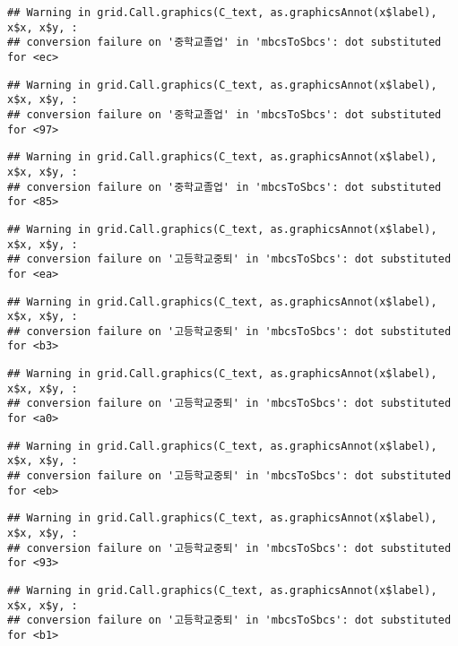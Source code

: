 \documentclass[
]{article}
\begin{document}
\begin{verbatim}
## Warning in grid.Call.graphics(C_text, as.graphicsAnnot(x$label), x$x, x$y, :
## conversion failure on '중학교졸업' in 'mbcsToSbcs': dot substituted for <ec>
\end{verbatim}

\begin{verbatim}
## Warning in grid.Call.graphics(C_text, as.graphicsAnnot(x$label), x$x, x$y, :
## conversion failure on '중학교졸업' in 'mbcsToSbcs': dot substituted for <97>
\end{verbatim}

\begin{verbatim}
## Warning in grid.Call.graphics(C_text, as.graphicsAnnot(x$label), x$x, x$y, :
## conversion failure on '중학교졸업' in 'mbcsToSbcs': dot substituted for <85>
\end{verbatim}

\begin{verbatim}
## Warning in grid.Call.graphics(C_text, as.graphicsAnnot(x$label), x$x, x$y, :
## conversion failure on '고등학교중퇴' in 'mbcsToSbcs': dot substituted for <ea>
\end{verbatim}

\begin{verbatim}
## Warning in grid.Call.graphics(C_text, as.graphicsAnnot(x$label), x$x, x$y, :
## conversion failure on '고등학교중퇴' in 'mbcsToSbcs': dot substituted for <b3>
\end{verbatim}

\begin{verbatim}
## Warning in grid.Call.graphics(C_text, as.graphicsAnnot(x$label), x$x, x$y, :
## conversion failure on '고등학교중퇴' in 'mbcsToSbcs': dot substituted for <a0>
\end{verbatim}

\begin{verbatim}
## Warning in grid.Call.graphics(C_text, as.graphicsAnnot(x$label), x$x, x$y, :
## conversion failure on '고등학교중퇴' in 'mbcsToSbcs': dot substituted for <eb>
\end{verbatim}

\begin{verbatim}
## Warning in grid.Call.graphics(C_text, as.graphicsAnnot(x$label), x$x, x$y, :
## conversion failure on '고등학교중퇴' in 'mbcsToSbcs': dot substituted for <93>
\end{verbatim}

\begin{verbatim}
## Warning in grid.Call.graphics(C_text, as.graphicsAnnot(x$label), x$x, x$y, :
## conversion failure on '고등학교중퇴' in 'mbcsToSbcs': dot substituted for <b1>
\end{verbatim}
\end{document}

